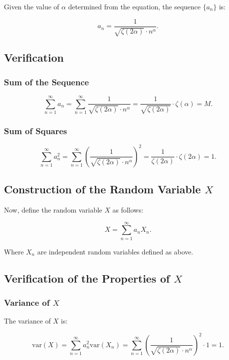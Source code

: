 \documentclass[a4 paper]{article}
\theoremstyle{boldStyle}
\theoremstyle{boldBlueStyle}
\theoremstyle{boldPurpleStyle}
\theoremstyle{boldRedStyle}
\begin{document}
\begin{enumerate}
Given the value of \(\alpha\) determined from the equation, the sequence \(\{a_n\}\) is:

\[
a_n = \frac{1}{\sqrt{\zeta(2\alpha)} \cdot n^\alpha}.
\]

\subsection*{Verification}

\subsubsection*{Sum of the Sequence}

\[
\sum_{n=1}^{\infty} a_n = \sum_{n=1}^{\infty} \frac{1}{\sqrt{\zeta(2\alpha)} \cdot n^\alpha} = \frac{1}{\sqrt{\zeta(2\alpha)}} \cdot \zeta(\alpha) = M.
\]

\subsubsection*{Sum of Squares}

\[
\sum_{n=1}^{\infty} a_n^2 = \sum_{n=1}^{\infty} \left(\frac{1}{\sqrt{\zeta(2\alpha)} \cdot n^\alpha}\right)^2 = \frac{1}{\zeta(2\alpha)} \cdot \zeta(2\alpha) = 1.
\]


\subsection*{Construction of the Random Variable \(X\)}

Now, define the random variable \(X\) as follows:

\[
X = \sum_{n=1}^{\infty} a_n X_{n}.
\]

Where ${X_{n}}$ are independent random variables defined as above.

\subsection*{Verification of the Properties of \(X\)}

\subsubsection*{Variance of \(X\)}

The variance of \(X\) is:

\[
\mathrm{var}(X) = \sum_{n=1}^{\infty} a_n^2 \mathrm{var}(X_n) = \sum_{n=1}^{\infty} \left(\frac{1}{\sqrt{\zeta(2\alpha)} \cdot n^\alpha}\right)^2 \cdot 1 = 1.
\]


\end{enumerate}
\end{document}
